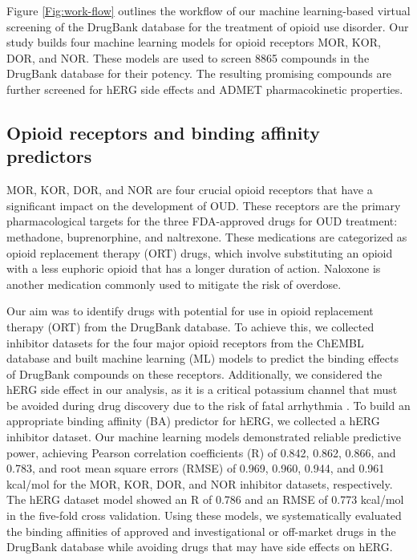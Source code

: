 \documentclass[10pt]{article}
\begin{document}
		Figure \ref{Fig:work-flow} outlines the workflow of our machine learning-based virtual screening of the DrugBank database for the treatment of opioid use disorder. Our study builds  four  machine learning models for opioid receptors MOR, KOR, DOR, and NOR. These models are used to screen 8865 compounds in the DrugBank database for their potency. The resulting promising compounds are further screened for hERG side effects and ADMET pharmacokinetic  properties. 
		
		
		\subsection{Opioid receptors and binding affinity predictors}
		
		
		MOR, KOR, DOR, and NOR are four crucial opioid receptors that have a significant impact on the development of OUD. These receptors are the primary pharmacological targets for the three FDA-approved drugs for OUD treatment: methadone, buprenorphine, and naltrexone. These medications are categorized as opioid replacement therapy (ORT) drugs, which involve substituting an opioid with a less euphoric opioid that has a longer duration of action. Naloxone is another medication commonly used to mitigate the risk of overdose.
		
		
		Our aim was to identify drugs with potential for use in opioid replacement therapy (ORT) from the DrugBank \cite{wishart2018drugbank} database. To achieve this, we collected inhibitor datasets for the four major opioid receptors from the ChEMBL database and built machine learning (ML) models to predict the binding effects of DrugBank compounds on these receptors. Additionally, we considered the hERG side effect in our analysis, as it is a critical potassium channel that must be avoided during drug discovery due to the risk of fatal arrhythmia \cite{sanguinetti2006herg}. To build an appropriate binding affinity (BA) predictor for hERG, we collected a hERG inhibitor dataset. Our machine learning models demonstrated reliable predictive power, achieving Pearson correlation coefficients (R) of 0.842, 0.862, 0.866, and 0.783, and root mean square errors (RMSE) of 0.969, 0.960, 0.944, and 0.961 kcal/mol for the MOR, KOR, DOR, and NOR inhibitor datasets, respectively. The hERG dataset model showed an R of 0.786 and an RMSE of 0.773 kcal/mol in the five-fold cross validation. Using these models, we systematically evaluated the binding affinities of approved and investigational or off-market drugs in the DrugBank database while avoiding drugs that may have side effects on hERG.
		
\end{document}
